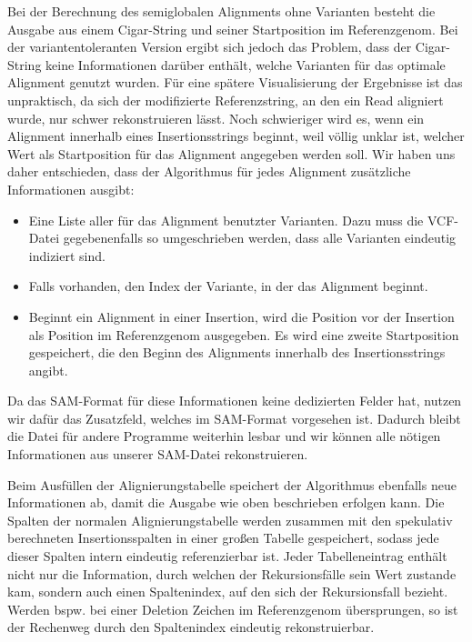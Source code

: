 Bei der Berechnung des semiglobalen Alignments ohne Varianten besteht die Ausgabe aus einem Cigar-String und seiner Startposition im Referenzgenom. Bei der variantentoleranten Version ergibt sich jedoch das Problem, dass der Cigar-String keine Informationen darüber enthält, welche Varianten für das optimale Alignment genutzt wurden. Für eine spätere Visualisierung der Ergebnisse ist das unpraktisch, da sich der modifizierte Referenzstring, an den ein Read aligniert wurde, nur schwer rekonstruieren lässt. Noch schwieriger wird es, wenn ein Alignment innerhalb eines Insertionsstrings beginnt, weil völlig unklar ist, welcher Wert als Startposition für das Alignment angegeben werden soll. Wir haben uns daher entschieden, dass der Algorithmus für jedes Alignment zusätzliche Informationen ausgibt:

\begin{itemize}
\item Eine Liste aller für das Alignment benutzter Varianten. Dazu muss die VCF-Datei gegebenenfalls so umgeschrieben werden, dass alle Varianten eindeutig indiziert sind.
\item Falls vorhanden, den Index der Variante, in der das Alignment beginnt.
\item Beginnt ein Alignment in einer Insertion, wird die Position vor der Insertion als Position im Referenzgenom ausgegeben. Es wird eine zweite Startposition gespeichert, die den Beginn des Alignments innerhalb des Insertionsstrings angibt.
\end{itemize}

Da das SAM-Format für diese Informationen keine dedizierten Felder hat, nutzen wir dafür das Zusatzfeld, welches im SAM-Format vorgesehen ist. Dadurch bleibt die Datei für andere Programme weiterhin lesbar und wir können alle nötigen Informationen aus unserer SAM-Datei rekonstruieren.

Beim Ausfüllen der Alignierungstabelle speichert der Algorithmus ebenfalls neue Informationen ab, damit die Ausgabe wie oben beschrieben erfolgen kann. Die Spalten der normalen Alignierungstabelle werden zusammen mit den spekulativ berechneten Insertionsspalten in einer großen Tabelle gespeichert, sodass jede dieser Spalten intern eindeutig referenzierbar ist. Jeder Tabelleneintrag enthält nicht nur die Information, durch welchen der Rekursionsfälle sein Wert zustande kam, sondern auch einen Spaltenindex, auf den sich der Rekursionsfall bezieht. Werden bspw. bei einer Deletion Zeichen im Referenzgenom übersprungen, so ist der Rechenweg durch den Spaltenindex eindeutig rekonstruierbar.

